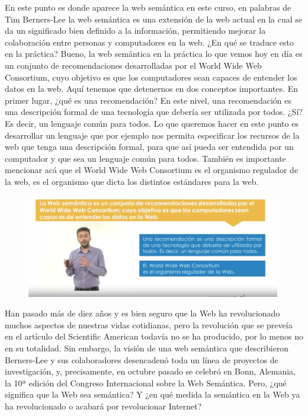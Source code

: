 En este punto es donde aparece la web semántica en este curso, en palabras de Tim Berners-Lee la web semántica es una extensión de la web actual en la cual se da un significado bien definido a la información, permitiendo mejorar la colaboración entre personas y computadores en la web. ¿En qué se traduce esto en la práctica? Bueno, la web semántica en la práctica lo que vemos hoy en día es un conjunto de recomendaciones desarrolladas por el World Wide Web Consortium, cuyo objetivo es que los computadores sean capaces de entender los datos en la web. Aquí tenemos que detenernos en dos conceptos importantes. En primer lugar, ¿qué es una recomendación? En este nivel, una recomendación es una descripción formal de una tecnología que debería ser utilizada por todos. ¿Sí? Es decir, un lenguaje común para todos. Lo que queremos hacer en este punto es desarrollar un lenguaje que por ejemplo nos permita especificar los recursos de la web que tenga una descripción formal, para que así pueda ser entendida por un computador y que sea un lenguaje común para todos. También es importante mencionar acá que el World Wide Web Consortium es el organismo regulador de la web, es el organismo que dicta los distintos estándares para la web.

 \begin{figure}[H]
	\centering
	\includegraphics[height=4.5cm]{imagenes/capitulo3/8}
	\caption{}
\end{figure}

Han pasado más de diez años y es bien seguro que la Web ha revolucionado muchos aspectos de nuestras vidas cotidianas, pero la revolución que se preveía en el artículo del Scientific American todavía no se ha producido, por lo menos no en su totalidad. Sin embargo, la visión de una web semántica que describieron Berners-Lee y sus colaboradores desencadenó toda un línea de proyectos de investigación, y, precisamente, en octubre pasado se celebró en Bonn, Alemania, la 10ª edición del Congreso Internacional sobre la Web Semántica. Pero, ¿qué significa que la Web sea semántica? Y ¿en qué medida la semántica en la Web ya ha revolucionado o acabará por revolucionar Internet? %

